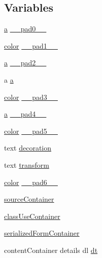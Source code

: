 \subsection*{Variables}
\begin{DoxyCompactItemize}
\item 
\hyperlink{style_8css_a5e8981582017bb8b84c21f148345d1f7}{a} \hyperlink{stylesheet_8css_ae12c266203291ee472d009d6d04e5a26}{\-\_\-\-\_\-pad0\-\_\-\-\_\-}
\item 
\hyperlink{index-3_8html_a1491993f9d93ab4bc0fdec8302f292a3}{color} \hyperlink{stylesheet_8css_abcb9288aac8a832fb63f4585c30ea142}{\-\_\-\-\_\-pad1\-\_\-\-\_\-}
\item 
\hyperlink{style_8css_a5e8981582017bb8b84c21f148345d1f7}{a} \hyperlink{stylesheet_8css_a30df2b59ddfa2f7a70feafd935a78b86}{\-\_\-\-\_\-pad2\-\_\-\-\_\-}
\item 
a \hyperlink{stylesheet_8css_a5e8981582017bb8b84c21f148345d1f7}{a}
\item 
\hyperlink{index-3_8html_a1491993f9d93ab4bc0fdec8302f292a3}{color} \hyperlink{stylesheet_8css_a870abb5c11976a33b19e0476f4e8a477}{\-\_\-\-\_\-pad3\-\_\-\-\_\-}
\item 
\hyperlink{style_8css_a5e8981582017bb8b84c21f148345d1f7}{a} \hyperlink{stylesheet_8css_a36d049b923f8c5cec553a6e1806e818a}{\-\_\-\-\_\-pad4\-\_\-\-\_\-}
\item 
\hyperlink{index-3_8html_a1491993f9d93ab4bc0fdec8302f292a3}{color} \hyperlink{stylesheet_8css_a399cdd17dba87ba7fd179492e8aec98b}{\-\_\-\-\_\-pad5\-\_\-\-\_\-}
\item 
text \hyperlink{stylesheet_8css_ad1ba8052b5e15f7bd3093dcb839f840b}{decoration}
\item 
text \hyperlink{stylesheet_8css_a24e9e97283417fa76b815806f72bfa98}{transform}
\item 
\hyperlink{index-3_8html_a1491993f9d93ab4bc0fdec8302f292a3}{color} \hyperlink{stylesheet_8css_ad2f2c6035f155ef0acc647320fccddb8}{\-\_\-\-\_\-pad6\-\_\-\-\_\-}
\item 
\hyperlink{stylesheet_8css_a95b7073a5f7ba26b01198ddcb9ab1123}{source\-Container}
\item 
\hyperlink{stylesheet_8css_a11ae13744beabb797e5de77e39a0bcaa}{class\-Use\-Container}
\item 
\hyperlink{stylesheet_8css_a7479cb5bc0a51d410d3d8d45bcd67db6}{serialized\-Form\-Container}
\item 
content\-Container details dl \hyperlink{stylesheet_8css_a107565fb4039d33b041380d6e0ea1d80}{dt}
\item 

\end{DoxyCompactItemize}
